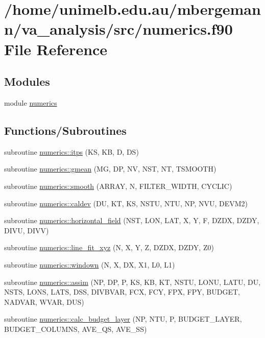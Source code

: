 \hypertarget{numerics_8f90}{}\section{/home/unimelb.edu.\+au/mbergemann/va\+\_\+analysis/src/numerics.f90 File Reference}
\label{numerics_8f90}
\subsection*{Modules}
\begin{DoxyCompactItemize}
\item 
module \hyperlink{namespacenumerics}{numerics}
\end{DoxyCompactItemize}
\subsection*{Functions/\+Subroutines}
\begin{DoxyCompactItemize}
\item 
subroutine \hyperlink{namespacenumerics_ac972e0e69239cba641ad373fee101472}{numerics\+::itps} (KS, KB, D, DS)
\item 
subroutine \hyperlink{namespacenumerics_afbd04035bb50e63d44980bf39cf84ac3}{numerics\+::gmean} (MG, DP, NV, N\+ST, NT, T\+S\+M\+O\+O\+TH)
\item 
subroutine \hyperlink{namespacenumerics_a354d8c793bd1515de7af7cfa32c51389}{numerics\+::smooth} (A\+R\+R\+AY, N, F\+I\+L\+T\+E\+R\+\_\+\+W\+I\+D\+TH, C\+Y\+C\+L\+IC)
\item 
subroutine \hyperlink{namespacenumerics_add44a47f4f996c0266711b825fd6bb20}{numerics\+::caldev} (DU, KT, KS, N\+S\+TU, N\+TU, NP, N\+VU, D\+E\+V\+M2)
\item 
subroutine \hyperlink{namespacenumerics_a9581a41d0b81a5ded9690972e499c629}{numerics\+::horizontal\+\_\+field} (N\+ST, L\+ON, L\+AT, X, Y, F, D\+Z\+DX, D\+Z\+DY, D\+I\+VU, D\+I\+VV)
\item 
subroutine \hyperlink{namespacenumerics_a8e58d8bf1c738af1a91517fdb8b81aa2}{numerics\+::line\+\_\+fit\+\_\+xyz} (N, X, Y, Z, D\+Z\+DX, D\+Z\+DY, Z0)
\item 
subroutine \hyperlink{namespacenumerics_aa16b459eac85058fd1da1b9ebc4555b9}{numerics\+::windown} (N, X, DX, X1, L0, L1)
\item 
subroutine \hyperlink{namespacenumerics_acc1dd6ef9a4cf200fd7701143c4ae29e}{numerics\+::assim} (NP, DP, P, KS, KB, KT, N\+S\+TU, L\+O\+NU, L\+A\+TU, DU, N\+S\+TS, L\+O\+NS, L\+A\+TS, D\+SS, D\+I\+V\+B\+V\+AR, F\+CX, F\+CY, F\+PX, F\+PY, B\+U\+D\+G\+ET, N\+A\+D\+V\+AR, W\+V\+AR, D\+US)
\item 
subroutine \hyperlink{namespacenumerics_adbe2d748ef22c981cddde813d1db9d77}{numerics\+::calc\+\_\+budget\+\_\+layer} (NP, N\+TU, P, B\+U\+D\+G\+E\+T\+\_\+\+L\+A\+Y\+ER, B\+U\+D\+G\+E\+T\+\_\+\+C\+O\+L\+U\+M\+NS, A\+V\+E\+\_\+\+QS, A\+V\+E\+\_\+\+SS)
\end{DoxyCompactItemize}
